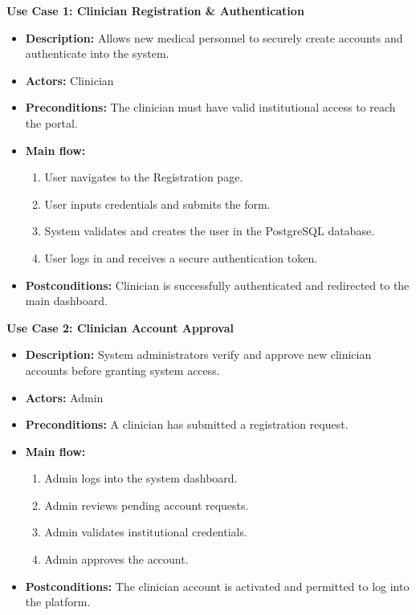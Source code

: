\documentclass{fisatprojectfinal}
\begin{document}
\textbf{Use Case 1: Clinician Registration \& Authentication}
\begin{itemize}
    \item[\textbf{|_______}] \textbf{Description:} Allows new medical personnel to securely create accounts and authenticate into the system.
    \item[\textbf{|_______}] \textbf{Actors:} Clinician
    \item[\textbf{|_______}] \textbf{Preconditions:} The clinician must have valid institutional access to reach the portal.
    \item[\textbf{|_______}] \textbf{Main flow:}
    \begin{enumerate}
        \item User navigates to the Registration page.
        \item User inputs credentials and submits the form.
        \item System validates and creates the user in the PostgreSQL database.
        \item User logs in and receives a secure authentication token.
    \end{enumerate}
    \item[\textbf{|_______}] \textbf{Postconditions:} Clinician is successfully authenticated and redirected to the main dashboard.
\end{itemize}

\textbf{Use Case 2: Clinician Account Approval}
\begin{itemize}
    \item[\textbf{|_______}] \textbf{Description:} System administrators verify and approve new clinician accounts before granting system access.
    \item[\textbf{|_______}] \textbf{Actors:} Admin
    \item[\textbf{|_______}] \textbf{Preconditions:} A clinician has submitted a registration request.
    \item[\textbf{|_______}] \textbf{Main flow:}
    \begin{enumerate}
        \item Admin logs into the system dashboard.
        \item Admin reviews pending account requests.
        \item Admin validates institutional credentials.
        \item Admin approves the account.
    \end{enumerate}
    \item[\textbf{|_______}] \textbf{Postconditions:} The clinician account is activated and permitted to log into the platform.
\end{itemize}
\end{document}
